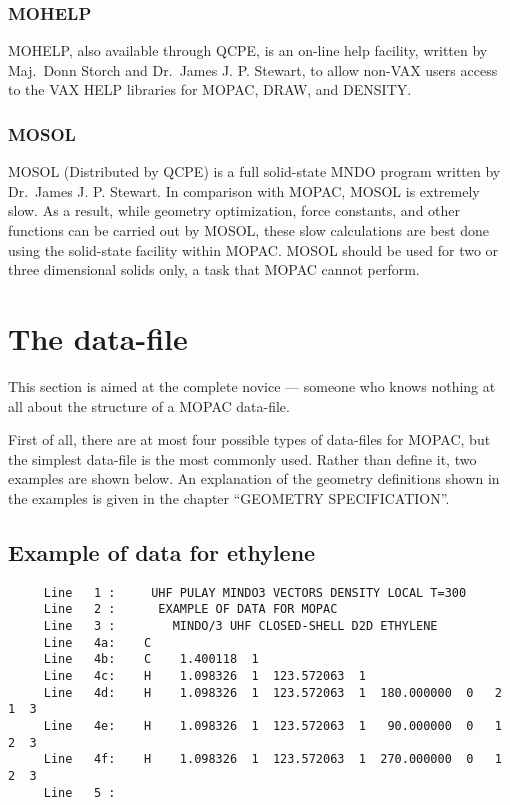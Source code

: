 \documentclass[11pt]{book}
\newcommand{\mi}[1]{#1\index{#1}}
\begin{document}
\subsubsection{MOHELP}
   \mi{MOHELP}, also available through QCPE, is an  on-line  help  facility,
   written by Maj.\ Donn Storch and Dr.\ James J. P. Stewart, to allow non-VAX
   users access to the VAX HELP libraries for MOPAC, DRAW, 
   and DENSITY.
        
\subsubsection{MOSOL}
   MOSOL (Distributed by QCPE)  is  
   a  full  solid-state  MNDO  program
   written  by  Dr.\ James J. P. Stewart.  In comparison with MOPAC, MOSOL is
   extremely  slow.   As  a  result,  while  geometry  optimization,   force
   constants,  and  other  functions can be carried out by MOSOL, these slow
   calculations are best done using the solid-state facility  within  MOPAC.
   \mi{MOSOL} should be used for two or three dimensional solids only, a task
   that MOPAC cannot perform.

\section{The data-file}
This section is aimed at the complete novice --- someone  who  knows
nothing at all about the structure of a MOPAC data-file.

   First of all, there are at most four possible  types  of  data-files
   for  MOPAC, but the simplest data-file is the most commonly used.  Rather
   than define it, two examples are shown  below.   An  explanation  of  the
   geometry  definitions  shown  in  the  examples  is  given in the chapter
   ``GEOMETRY SPECIFICATION''.

\subsection{Example of data for ethylene}
\begin{verbatim}
     Line   1 :     UHF PULAY MINDO3 VECTORS DENSITY LOCAL T=300 
     Line   2 :      EXAMPLE OF DATA FOR MOPAC
     Line   3 :        MINDO/3 UHF CLOSED-SHELL D2D ETHYLENE
     Line   4a:    C 
     Line   4b:    C    1.400118  1 
     Line   4c:    H    1.098326  1  123.572063  1 
     Line   4d:    H    1.098326  1  123.572063  1  180.000000  0   2  1  3
     Line   4e:    H    1.098326  1  123.572063  1   90.000000  0   1  2  3
     Line   4f:    H    1.098326  1  123.572063  1  270.000000  0   1  2  3
     Line   5 : 
\end{verbatim}
        
\end{document}
